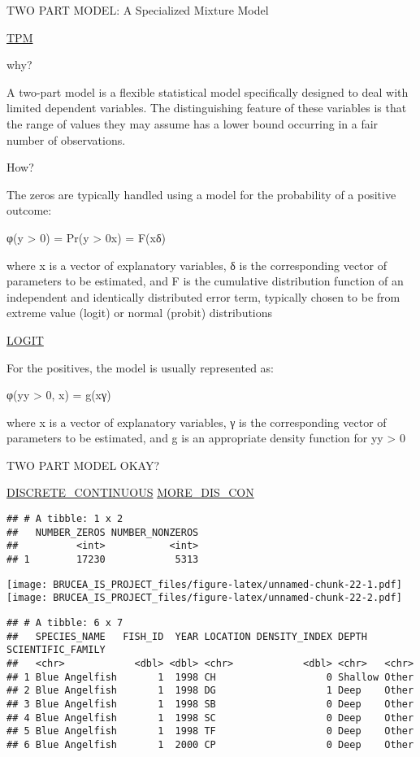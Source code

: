 \documentclass[
]{article}
\begin{document}
TWO PART MODEL: A Specialized Mixture Model

\href{https://journals.sagepub.com/doi/pdf/10.1177/1536867X1501500102}{TPM}

why?

A two-part model is a flexible statistical model specifically designed
to deal with limited dependent variables. The distinguishing feature of
these variables is that the range of values they may assume has a lower
bound occurring in a fair number of observations.

How?

The zeros are typically handled using a model for the probability of a
positive outcome:

φ(y \textgreater{} 0) = Pr(y \textgreater{} 0\textbar x) = F(xδ)

where x is a vector of explanatory variables, δ is the corresponding
vector of parameters to be estimated, and F is the cumulative
distribution function of an independent and identically distributed
error term, typically chosen to be from extreme value (logit) or normal
(probit) distributions

\href{https://www.theanalysisfactor.com/what-is-logit-function/}{LOGIT}

For the positives, the model is usually represented as:

φ(y\textbar y \textgreater{} 0, x) = g(xγ)

where x is a vector of explanatory variables, γ is the corresponding
vector of parameters to be estimated, and g is an appropriate density
function for y\textbar y \textgreater{} 0

TWO PART MODEL OKAY?

\href{https://stats.stackexchange.com/questions/345474/residual-vs-fitted}{DISCRETE\_CONTINUOUS}
\href{https://stats.stackexchange.com/questions/120751/not-sure-about-the-interpretation-of-this-residual-plot}{MORE\_DIS\_CON}

\begin{verbatim}
## # A tibble: 1 x 2
##   NUMBER_ZEROS NUMBER_NONZEROS
##          <int>           <int>
## 1        17230            5313
\end{verbatim}

\texttt{[image: BRUCEA\_IS\_PROJECT\_files/figure-latex/unnamed-chunk-22-1.pdf]}
\texttt{[image: BRUCEA\_IS\_PROJECT\_files/figure-latex/unnamed-chunk-22-2.pdf]}

\begin{verbatim}
## # A tibble: 6 x 7
##   SPECIES_NAME   FISH_ID  YEAR LOCATION DENSITY_INDEX DEPTH   SCIENTIFIC_FAMILY
##   <chr>            <dbl> <dbl> <chr>            <dbl> <chr>   <chr>            
## 1 Blue Angelfish       1  1998 CH                   0 Shallow Other            
## 2 Blue Angelfish       1  1998 DG                   1 Deep    Other            
## 3 Blue Angelfish       1  1998 SB                   0 Deep    Other            
## 4 Blue Angelfish       1  1998 SC                   0 Deep    Other            
## 5 Blue Angelfish       1  1998 TF                   0 Deep    Other            
## 6 Blue Angelfish       1  2000 CP                   0 Deep    Other
\end{verbatim}
\end{document}
